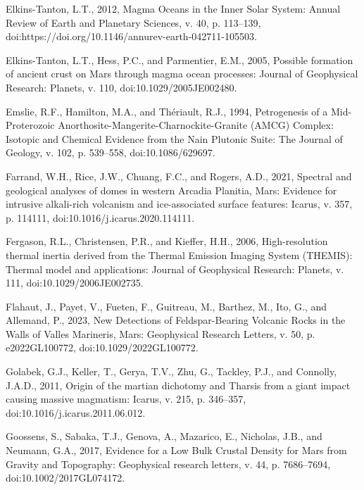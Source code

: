 \documentclass[11pt]{article}
\begin{document}
\begin{thebibliography}{99}
 Elkins-Tanton, L.T., 2012, Magma Oceans in the Inner Solar System: Annual Review of Earth and Planetary Sciences, v. 40, p. 113--139, doi:https://doi.org/10.1146/annurev-earth-042711-105503.

 Elkins-Tanton, L.T., Hess, P.C., and Parmentier, E.M., 2005, Possible formation of ancient crust on Mars through magma ocean processes: Journal of Geophysical Research: Planets, v. 110, doi:10.1029/2005JE002480.

 Emslie, R.F., Hamilton, M.A., and Thériault, R.J., 1994, Petrogenesis of a Mid-Proterozoic Anorthosite-Mangerite-Charnockite-Granite (AMCG) Complex: Isotopic and Chemical Evidence from the Nain Plutonic Suite: The Journal of Geology, v. 102, p. 539--558, doi:10.1086/629697.

 Farrand, W.H., Rice, J.W., Chuang, F.C., and Rogers, A.D., 2021, Spectral and geological analyses of domes in western Arcadia Planitia, Mars: Evidence for intrusive alkali-rich volcanism and ice-associated surface features: Icarus, v. 357, p. 114111, doi:10.1016/j.icarus.2020.114111.

 Fergason, R.L., Christensen, P.R., and Kieffer, H.H., 2006, High-resolution thermal inertia derived from the Thermal Emission Imaging System (THEMIS): Thermal model and applications: Journal of Geophysical Research: Planets, v. 111, doi:10.1029/2006JE002735.

 Flahaut, J., Payet, V., Fueten, F., Guitreau, M., Barthez, M., Ito, G., and Allemand, P., 2023, New Detections of Feldspar-Bearing Volcanic Rocks in the Walls of Valles Marineris, Mars: Geophysical Research Letters, v. 50, p. e2022GL100772, doi:10.1029/2022GL100772.

 Golabek, G.J., Keller, T., Gerya, T.V., Zhu, G., Tackley, P.J., and Connolly, J.A.D., 2011, Origin of the martian dichotomy and Tharsis from a giant impact causing massive magmatism: Icarus, v. 215, p. 346--357, doi:10.1016/j.icarus.2011.06.012.

 Goossens, S., Sabaka, T.J., Genova, A., Mazarico, E., Nicholas, J.B., and Neumann, G.A., 2017, Evidence for a Low Bulk Crustal Density for Mars from Gravity and Topography: Geophysical research letters, v. 44, p. 7686--7694, doi:10.1002/2017GL074172.


\end{thebibliography}
\end{document}

